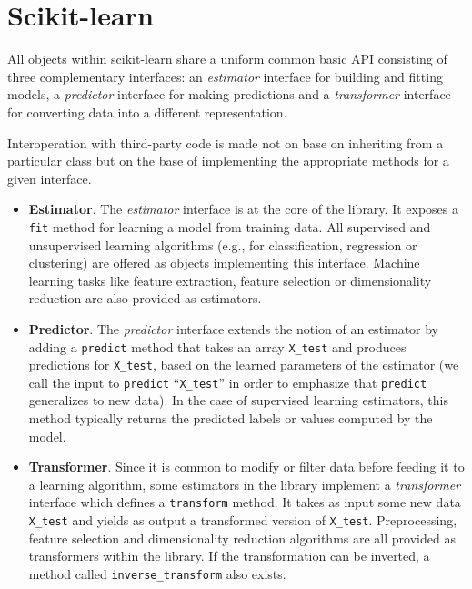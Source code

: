 \documentclass{frontiersSCNS} %
\begin{document}
\section{Scikit-learn}
\label{scikitlearn}

All objects within scikit-learn share a uniform common basic API consisting of three
complementary interfaces: an \textit{estimator} interface for building and
fitting models, a \textit{predictor} interface for making predictions and a
\textit{transformer} interface for converting data into a different representation.

Interoperation with third-party code is made not on base on inheriting from a
particular class but on the base of implementing the appropriate methods for a
given interface.

\begin{itemize}
\item {\bf Estimator}. The \textit{estimator} interface is at the core of the library. It exposes a
    \texttt{fit} method for learning a model from training data.  All supervised
    and unsupervised learning algorithms (e.g., for classification, regression or
    clustering) are offered as objects implementing this interface. Machine
    learning tasks like feature extraction, feature selection or dimensionality
    reduction are also provided as estimators.

\item {\bf Predictor}. The \textit{predictor} interface extends the notion of an estimator
    by adding a \texttt{predict}
    method that takes an array \texttt{X\_test} and produces
    predictions for \texttt{X\_test}, based on the learned parameters of the
    estimator (we call the input to \texttt{predict} ``\texttt{X\_test}'' in order
    to emphasize that \texttt{predict} generalizes to new data). In the case of
    supervised learning estimators, this method typically returns the predicted
    labels or values computed by the model.

\item {\bf Transformer}. Since it is common to modify or filter data before feeding it to a learning
    algorithm, some estimators in the library implement a \textit{transformer}
    interface which defines a \texttt{transform} method. It takes as input some new
    data \texttt{X\_test} and yields as output a transformed version of
    \texttt{X\_test}. Preprocessing, feature selection and dimensionality reduction
    algorithms are all provided as transformers within the library. If the transformation
    can be inverted, a method called \verb!inverse_transform! also exists.

\end{itemize}
\end{document}
